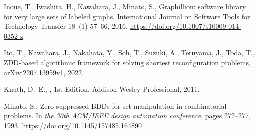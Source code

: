 \documentclass{article}
\begin{document}
\begin{thebibliography}{99}

  Inoue, T., Iwashita, H., Kawahara, J., Minato, S.,
  \newblock Graphillion: software library
    for very large sets of labeled graphs, International Journal on Software
    Tools for Technology Transfer 18~(1) 57--66, 2016.
  \newblock \url {https://doi.org/10.1007/s10009-014-0352-z}

  Ito, T., Kawahara, J., Nakahata, Y., Soh, T., Suzuki, A., Teruyama, J., Toda, T.,
  \newblock ZDD-based algorithmic framework for solving shortest reconfiguration problems,
  \newblock arXiv:2207.13959v1, 2022.

  Knuth, D.~E.,
  , 1st Edition, Addison-Wesley Professional, 2011.


Minato, S.,
\newblock Zero-suppressed {BDD}s for set manipulation in combinatorial
  problems.
\newblock In {\em the 30th ACM/IEEE design automation conference}, pages
  272--277, 1993.
\newblock \url {https://doi.org/10.1145/157485.164890}



\end{thebibliography}
\end{document}
